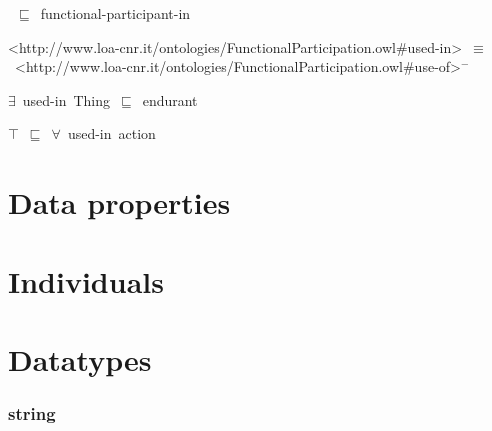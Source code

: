 \documentclass{article}
\begin{document}
~\ensuremath{\sqsubseteq}~functional-participant-in

<http://www.loa-cnr.it/ontologies/FunctionalParticipation.owl#used-in>~\ensuremath{\equiv}~<http://www.loa-cnr.it/ontologies/FunctionalParticipation.owl#use-of>\ensuremath{^-}

\ensuremath{\exists}~used-in~Thing~\ensuremath{\sqsubseteq}~endurant

\ensuremath{\top}~\ensuremath{\sqsubseteq}~\ensuremath{\forall}~used-in~action

\section*{Data properties}\section*{Individuals}\section*{Datatypes}\subsubsection*{string}
\end{document}
